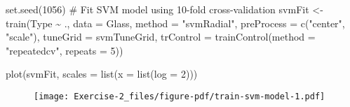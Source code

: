 \documentclass[
  letterpaper,
  DIV=11,
  numbers=noendperiod]{scrartcl}
\newenvironment{Shaded}{\begin{snugshade}}{\end{snugshade}}
\newcommand{\AttributeTok}[1]{\textcolor[rgb]{0.40,0.45,0.13}{#1}}
\newcommand{\CommentTok}[1]{\textcolor[rgb]{0.37,0.37,0.37}{#1}}
\newcommand{\DecValTok}[1]{\textcolor[rgb]{0.68,0.00,0.00}{#1}}
\newcommand{\FunctionTok}[1]{\textcolor[rgb]{0.28,0.35,0.67}{#1}}
\newcommand{\NormalTok}[1]{\textcolor[rgb]{0.00,0.23,0.31}{#1}}
\newcommand{\OtherTok}[1]{\textcolor[rgb]{0.00,0.23,0.31}{#1}}
\newcommand{\SpecialCharTok}[1]{\textcolor[rgb]{0.37,0.37,0.37}{#1}}
\newcommand{\StringTok}[1]{\textcolor[rgb]{0.13,0.47,0.30}{#1}}
\begin{document}
\begin{Shaded}
\begin{Highlighting}[]
\FunctionTok{set.seed}\NormalTok{(}\DecValTok{1056}\NormalTok{)}
\CommentTok{\# Fit SVM model using 10{-}fold cross{-}validation}
\NormalTok{svmFit }\OtherTok{\textless{}{-}} \FunctionTok{train}\NormalTok{(Type }\SpecialCharTok{\textasciitilde{}}\NormalTok{ .,}
                \AttributeTok{data =}\NormalTok{ Glass, }\AttributeTok{method =} \StringTok{"svmRadial"}\NormalTok{,}
                \AttributeTok{preProcess =} \FunctionTok{c}\NormalTok{(}\StringTok{"center"}\NormalTok{, }\StringTok{"scale"}\NormalTok{),}
                \AttributeTok{tuneGrid =}\NormalTok{ svmTuneGrid,}
                \AttributeTok{trControl =} \FunctionTok{trainControl}\NormalTok{(}\AttributeTok{method =} \StringTok{"repeatedcv"}\NormalTok{, }\AttributeTok{repeats =} \DecValTok{5}\NormalTok{))}


\FunctionTok{plot}\NormalTok{(svmFit, }\AttributeTok{scales =} \FunctionTok{list}\NormalTok{(}\AttributeTok{x =} \FunctionTok{list}\NormalTok{(}\AttributeTok{log =} \DecValTok{2}\NormalTok{)))}
\end{Highlighting}
\end{Shaded}

\begin{figure}[H]

{\centering \texttt{[image: Exercise-2\_files/figure-pdf/train-svm-model-1.pdf]}

}

\end{figure}
\end{document}
